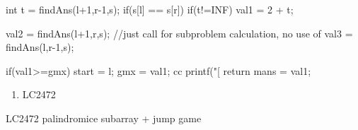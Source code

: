 \begin{solution}
\begin{code2}
{            int t = findAns(l+1,r-1,s);
            if(s[l] == s[r])
            { 
                if(t!=INF)
                    val1 = 2 + t;
            }
            
            {
                 val2 = findAns(l+1,r,s); //just call for subproblem calculation, no use of
                 val3 = findAns(l,r-1,s);
            }
            
            if(val1>=gmx)
            {
                start = l;
                gmx = val1;
            }
          cc printf("[%
            return mans = val1;       
        }
    \end{code2}


\end{solution}

\begin{pratice}

    \begin{enumerate}
        \item LC2472
    \end{enumerate}

\end{pratice}

\begin{praticeHints}
    \item LC2472 palindromice subarray + jump game
\end{praticeHints}